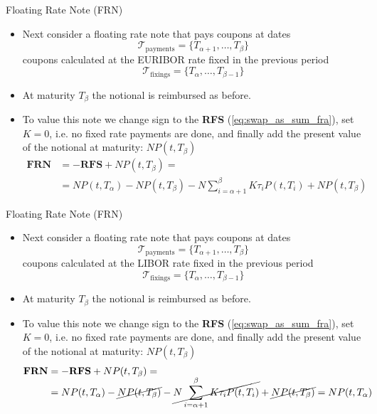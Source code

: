\documentclass{beamer}
\begin{document}
\begin{frame}{Floating Rate Note (FRN)}
	\begin{itemize}
		\item<0-> Next consider a floating rate note that pays coupons at dates
		\begin{equation*}
			\mathcal{T}_{\text{payments}} = \{T_{\alpha+1},\ldots,T_\beta\}
		\end{equation*}
		coupons calculated at the EURIBOR rate fixed in the previous period
		\begin{equation*}
			\mathcal{T}_{\text{fixings}} = \{T_{\alpha},\ldots,T_{\beta - 1}\}
		\end{equation*}
		\item<1-> At maturity $T_\beta$ the notional is reimbursed as before.
		\item<2-> To value this note we change sign to the \textbf{RFS} (\cref{eq:swap_as_sum_fra}), set $K=0$, i.e. no fixed rate payments are done, and finally add the present value of the notional at maturity: $NP(t,T_\beta)$
		\begin{equation*}
			\begin{aligned}
			\textbf{FRN} &= -\textbf{RFS} + NP(t,T_\beta) =\\
			& =NP(t,T_\alpha)-NP(t,T_\beta)-N\sum_{i=\alpha+1}^{\beta}K\tau_i P(t,T_i) + NP(t,T_\beta)
		\end{aligned}
		\end{equation*}
	\end{itemize}
\end{frame}

\begin{frame}{Floating Rate Note (FRN)}
	\begin{itemize}
		\item Next consider a floating rate note that pays coupons at dates
		\begin{equation*}
			\mathcal{T}_{\text{payments}} = \{T_{\alpha+1},\ldots,T_\beta\}
		\end{equation*}
		coupons calculated at the LIBOR rate fixed in the previous period
		\begin{equation*}
			\mathcal{T}_{\text{fixings}} = \{T_{\alpha},\ldots,T_{\beta - 1}\}
		\end{equation*}
		\item At maturity $T_\beta$ the notional is reimbursed as before.
		\item To value this note we change sign to the \textbf{RFS} (\cref{eq:swap_as_sum_fra}), set $K=0$, i.e. no fixed rate payments are done, and finally add the present value of the notional at maturity: $NP(t,T_\beta)$
		\begin{equation*}
		\begin{aligned}
			\textbf{FRN} &= -\textbf{RFS} + NP(t,T_\beta) =\\
			& =NP(t,T_\alpha)-\cancel{NP(t,T_\beta)}-\cancel{N\sum_{i=\alpha+1}^{\beta}K\tau_i P(t,T_i)} + \cancel{NP(t,T_\beta)} =NP(t,T_\alpha)
		\end{aligned}
		\end{equation*}
	\end{itemize}
\end{frame}
\end{document}

